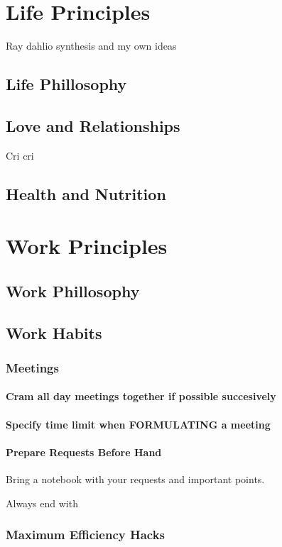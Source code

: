 \documentclass{book}
\begin{document}
\chapter{Life Principles}
{\color{blue}Ray dahlio synthesis and my own ideas}
\section{Life Phillosophy}
\section{Love and Relationships}
Cri cri
\section{Health and Nutrition}

\chapter{Work Principles}
\section{Work Phillosophy}

\section{Work Habits}
\subsection{Meetings}
\subsubsection{Cram all day meetings together if possible succesively}

\subsubsection{Specify time limit when FORMULATING a meeting}

\subsubsection{Prepare Requests Before Hand}

Bring a notebook with your requests and important points.

Always end with 
\subsection{Maximum Efficiency Hacks}
\end{document}
